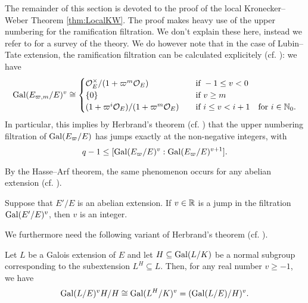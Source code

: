 \documentclass[../main.tex]{subfiles}
\begin{document}
The remainder of this section is devoted to the proof of the local Kronecker--Weber 
Theorem \ref{thm:LocalKW}.
The proof makes heavy use of the upper numbering for the ramification filtration.
We don't explain these here, instead we refer to \cite[Chapter
IV]{serre2013local} for a survey of the theory. We
do however note that in the case of Lubin--Tate extension, the 
ramification filtration can be calculated explicitely (cf. \cite[Theorem
2]{gold1981local}): we have
\begin{equation}\label{eq:CalculationOfUpperRamificationFiltration}
  \operatorname{Gal}(E_{\varpi, m}/E)^v \cong \begin{cases}
    \mathcal{O}_E^\times/(1 + \varpi^m \mathcal{O}_E) \quad &\text{if } -1 \leq v < 0 \\
    \{0\} \quad &\text{if } v \geq m \\
    (1 + \varpi^i \mathcal{O}_E)/(1+\varpi^m \mathcal{O}_E) \quad &\text{if } i \leq v < i+1
    \quad \text{for } i \in \mathbb{N}_0.
  \end{cases}
\end{equation}
In particular, this implies by Herbrand's theorem (cf. \cite[Ch. 4, Proposition
-14]{serre2013local}) that the upper numbering filtration of 
$\operatorname{Gal}(E_\varpi/E)$ has jumps exactly at the non-negative integers, with
\begin{equation*}
  q-1 \leq [\operatorname{Gal}(E_\varpi/E)^{v} : \operatorname{Gal}(E_\varpi/E)^{v+1}].
\end{equation*}

By the Hasse--Arf theorem, the same phenomenon occurs for any abelian extension 
(cf. \cite{arf1940untersuchungen}).
\begin{thm}\label{thm:Hasse--Arf}
  Suppose that $E'/E$ is an abelian extension. If $v \in \mathbb{R}$ is a jump in the 
  filtration $\operatorname{Gal}(E'/E)^v$, then $v$ is an integer.
\end{thm}

We furthermore need the following variant of Herbrand's theorem (cf. \cite[Chapter IV,
Proposition 14]{serre2013local}).
\begin{thm}\label{prop:HerbrandsThm}
  Let $L$ be a Galois extension of $E$ and let $H \subseteq \operatorname{Gal}(L/K)$ be a normal subgroup
  corresponding to the subextension $L^H \subseteq L$. Then, for any real number $v \geq -1$, 
  we have
  \begin{equation*}
    \operatorname{Gal}(L/E)^v H / H \cong \operatorname{Gal}(L^H/K)^v = (\operatorname{Gal}(L/E)/H)^v.
  \end{equation*}
\end{thm}
\end{document}
